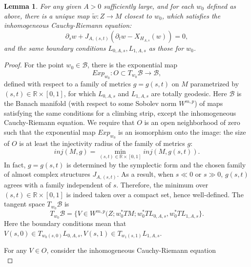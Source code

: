 \documentclass{amsart}
\newtheorem{lemma}[theorem]{Lemma}
\numberwithin{equation}{section}
\numberwithin{figure}{section}
\begin{document}
\begin{lemma}\label{perturbing the glued map to a climbing strip}
	For any given $A > 0$ sufficiently large, and for each $w_{0}$ defined as above, there is a unique map $\tilde{w}: Z \to M$ closest to $w_{0}$, which satisfies the inhomogeneous Cauchy-Riemann equation:
\begin{equation}
\partial_{s} w + J_{A, (s, t)}(\partial_{t} w - X_{H_{A, s}}(w)) = 0,
\end{equation}
and the same boundary conditions $L_{0, A, s}, L_{1, A, s}$ as those for $w_{0}$.
\end{lemma}
\begin{proof}
	For the point $w_{0} \in \mathcal{B}$, there is the exponential map
\begin{equation*}
Exp_{w_{0}}: O \subset T_{w_{0}}\mathcal{B} \to \mathcal{B},
\end{equation*}
defined with respect to a family of metrics $g = g(s, t)$ on $M$ parametrized by $(s, t) \in \mathbb{R} \times [0, 1]$, for which $L_{0, A, s}$ and $L_{1, A, s}$ are totally geodesic.
Here $\mathcal{B}$ is the Banach manifold (with respect to some Sobolev norm $W^{m, p}$) of maps satisfying the same conditions for a climbing strip, except the inhomogeneous Cauchy-Riemann equation. We require that $O$ is an open neighborhood of zero such that the exponential map $Exp_{w_{0}}$ is an isomorphism onto the image: the size of $O$ is at least the injectivity radius of the family of metrics $g$:
\begin{equation*}
inj(M, g) = \min_{(s, t) \in \mathbb{R} \times [0, 1]} inj(M, g(s, t)).
\end{equation*}
In fact, $g = g(s, t)$ is determined by the symplectic form and the chosen family of almost complex structures $J_{A, (s, t)}$. As a result, when $s \ll 0$ or $s \gg 0$, $g(s, t)$ agrees with a family independent of $s$. Therefore, the minimum over $(s, t) \in \mathbb{R} \times [0, 1]$ is indeed taken over a compact set, hence well-defined.
The tangent space $T_{w_{0}}\mathcal{B}$ is
\begin{equation*}
T_{w_{0}}\mathcal{B} = \{V \in W^{m, p}(Z; w_{0}^{*}TM; w_{0}^{*}TL_{0, A, s}, w_{0}^{*}TL_{1, A, s} \}.
\end{equation*}
Here the boundary conditions mean that $V(s, 0) \in T_{w_{0}(s, 0)}L_{0, A, s}, V(s, 1) \in T_{w_{1}(s, 1)}L_{1, A, s}$. \par
	For any $V \in O$, consider the inhomogeneous Cauchy-Riemann equation
\begin{equation}

\end{equation}
\end{proof}
\end{document}
